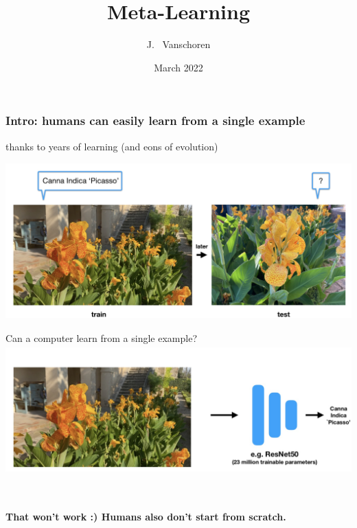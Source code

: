\documentclass[aspectratio=169,t,handout,xcolor={usenames,dvipsnames}]{beamer}
\title[Meta-Learning] %
{Meta-Learning}
\author[Joaquin Vanschoren] %
{J.~ Vanschoren\inst{1}}
\institute[VFU] %
{
  \inst{1}%
  Faculty of Mathematics and Computer Science\\
  TU Eindhoven
}
\date[2022] %
{March 2022}
\begin{document}
\frame{\titlepage}





\begin{frame}
\frametitle{Intro: humans can easily learn from a single example}
thanks to years of learning (and eons of evolution) 

\includegraphics[height=6cm]{image/Jietu20220328-162621.jpg}

\end{frame}

\begin{frame}{Can a computer learn from a single example?}
\includegraphics[height=5cm]{image/Jietu20220328-163023.jpg}

\hspace*{\fill} \
\hspace*{\fill} \
\pause
\centerline{\textbf{That won’t work :) Humans also don’t start from scratch.}}
\end{frame}
\end{document}
